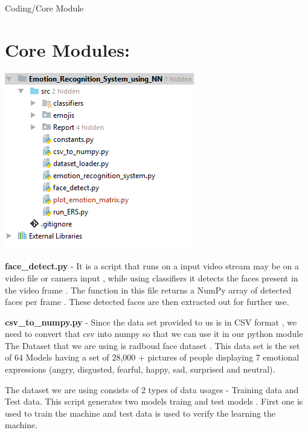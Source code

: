 \begin{center}
	{\Huge Coding/Core Module}
\end{center}

\setcounter{section}{0}
\section{Core Modules:}
\begin{center}
	\includegraphics{Images/code_tree.png}
\end{center}

\textbf{face\_detect.py} - It is a script that runs on a input video stream may be on a video file or camera input , while using classifiers it detects the faces present in the video frame . The function in this file returns a NumPy array of detected faces per frame . These detected faces are then extracted out for further use.

\textbf{csv\_to\_numpy.py} - Since the data set provided to us is in CSV format , we need to convert that csv into numpy so that we can use it in our python module
The Dataset that we are using is radboud face dataset . This data set is the set of 64 Models having a set of 28,000 + pictures of people displaying 7 emotional expressions (angry, disgusted, fearful, happy, sad, surprised and neutral).

The dataset we are using consists of 2 types of data usages  - Training data and Test data. This script generates two models traing and test models . First one is used to train the machine and test data is used to verify the learning the machine.